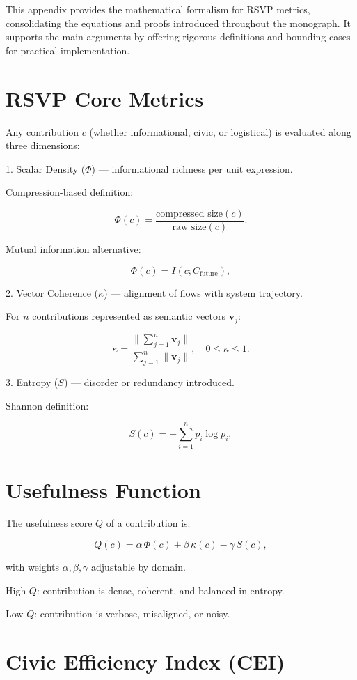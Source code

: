 \documentclass{book}
\begin{document}
This appendix provides the mathematical formalism for RSVP metrics, consolidating the equations and proofs introduced throughout the monograph. It supports the main arguments by offering rigorous definitions and bounding cases for practical implementation.

\section{RSVP Core Metrics}

Any contribution \( c \) (whether informational, civic, or logistical) is evaluated along three dimensions:

1. Scalar Density (\(\Phi\)) — informational richness per unit expression.

Compression-based definition:

\[ \Phi(c) = \frac{\text{compressed size}(c)}{\text{raw size}(c)}. \]

Mutual information alternative:

\[ \Phi(c) = I(c; C_{\text{future}}), \]

2. Vector Coherence (\(\kappa\)) — alignment of flows with system trajectory.

For \( n \) contributions represented as semantic vectors \( \mathbf{v}_j \):

\[ \kappa = \frac{\|\sum_{j=1}^n \mathbf{v}_j\|}{\sum_{j=1}^n \|\mathbf{v}_j\|}, \quad 0 \leq \kappa \leq 1. \]

3. Entropy (\( S \)) — disorder or redundancy introduced.

Shannon definition:

\[ S(c) = -\sum_{i=1}^n p_i \log p_i, \]

\section{Usefulness Function}

The usefulness score \( Q \) of a contribution is:

\[ Q(c) = \alpha \, \Phi(c) + \beta \, \kappa(c) - \gamma \, S(c), \]

with weights \( \alpha, \beta, \gamma \) adjustable by domain.

High \( Q \): contribution is dense, coherent, and balanced in entropy.

Low \( Q \): contribution is verbose, misaligned, or noisy.

\section{Civic Efficiency Index (CEI)}
\end{document}
